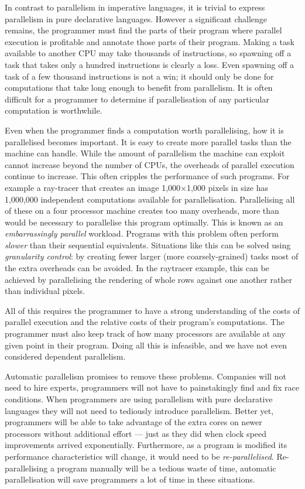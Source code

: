 In contrast to parallelism in imperative languages,
it is trivial to express parallelism in pure declarative languages.
However a significant challenge remains,
the programmer must find the parts of their program where parallel execution
is profitable and annotate those parts of their program.
Making a task available to another CPU
may take thousands of instructions,
so spawning off a task that takes only a hundred instructions is clearly a
loss.
Even spawning off a task of a few thousand instructions is not a win;
it should only be done for computations
that take long enough to benefit from parallelism.
It is often difficult for a programmer to determine if parallelisation of
any particular computation is worthwhile.

Even when the programmer finds a computation worth parallelising,
how it is parallelised becomes important.
It is easy to create more parallel tasks than the machine can handle.
While the amount of parallelism the machine can exploit
cannot increase beyond the number of CPUs,
the overheads of parallel execution continue to increase.
This often cripples the performance of such programs.
For example a ray-tracer that creates an image
1,000$\times$1,000 pixels in size has 1,000,000 independent computations
available for parallelisation.
Parallelising all of these on a four processor machine creates too
many overheads, more than would be necessary to parallelise this program
optimally.
This is known as an \emph{embarrassingly parallel} workload.
Programs with this problem often perform \emph{slower} than their sequential
equivalents.
Situations like this can be solved using \emph{granularity control}:
by creating fewer larger (more coarsely-grained) tasks most of the extra
overheads can be avoided.
In the raytracer example, this can be achieved by parallelising the
rendering of whole rows against one another rather than individual pixels.

All of this requires the programmer to have a strong understanding of the
costs of parallel execution
and the relative costs of their program's computations.
The programmer must also keep track of how many processors are available at
any given point in their program.
Doing all this is infeasible,
and we have not even considered dependent parallelism.

Automatic parallelism promises to remove these problems.
Companies will not need to hire experts,
programmers will not have to painstakingly find and fix race conditions.
When programmers are using parallelism with pure declarative languages they
will not need to tediously introduce parallelism.
Better yet,
programmers will be able to take advantage of the extra cores on newer
processors without additional effort ---
just as they did when clock speed improvements arrived exponentially.
Furthermore, 
as a program is modified its performance characteristics will change,
it would need to be \emph{re-parallelised}.
Re-parallelising a program manually will be a tedious waste of time,
automatic parallelisation will save programmers a lot of time in these
situations.

